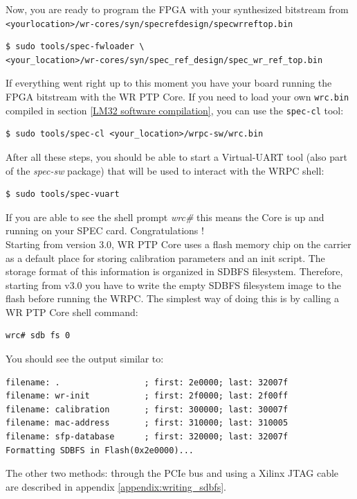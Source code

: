 \documentclass[a4paper, 12pt]{article}
\renewcommand{\_}{\underscore\allowbreak}
\begin{document}
Now, you are ready to program the FPGA with your synthesized bitstream from
\texttt{<your\_location>/wr-cores/syn/spec\_ref\_design/spec\_wr\_ref\_top.bin}
\begin{lstlisting}
$ sudo tools/spec-fwloader \
<your_location>/wr-cores/syn/spec_ref_design/spec_wr_ref_top.bin
\end{lstlisting}

If everything went right up to this moment you have your board running the FPGA 
bitstream with the WR PTP Core. If you need to load your own \texttt{wrc.bin}
compiled in section \ref{LM32 software compilation}, you can use the
\texttt{spec-cl} tool:
\begin{lstlisting}
$ sudo tools/spec-cl <your_location>/wrpc-sw/wrc.bin
\end{lstlisting}

After all these steps, you should be able to start a Virtual-UART tool (also
part of the \textit{spec-sw} package) that will be used to interact with the
WRPC shell:
\begin{lstlisting}
$ sudo tools/spec-vuart
\end{lstlisting}
If you are able to see the shell prompt \textit{wrc\#} this means the Core
is up and running on your SPEC card. Congratulations !\\

Starting from version 3.0, WR PTP Core uses a flash memory chip on the carrier
as a default place for storing calibration parameters and an init script.
The storage format of this information is organized in SDBFS filesystem.
Therefore, starting from v3.0 you have to write the empty
SDBFS filesystem image to the flash before running the WRPC. The simplest way of
doing this is by calling a WR PTP Core shell command:
\begin{lstlisting}
wrc# sdb fs 0
\end{lstlisting}
You should see the output similar to:
\begin{lstlisting}[basicstyle=\scriptsize\ttfamily]
filename: .                 ; first: 2e0000; last: 32007f
filename: wr-init           ; first: 2f0000; last: 2f00ff
filename: calibration       ; first: 300000; last: 30007f
filename: mac-address       ; first: 310000; last: 310005
filename: sfp-database      ; first: 320000; last: 32007f
Formatting SDBFS in Flash(0x2e0000)...
\end{lstlisting}

The other two methods: through the PCIe bus and using a Xilinx JTAG cable are
described in appendix \ref{appendix:writing_sdbfs}.
\end{document}
